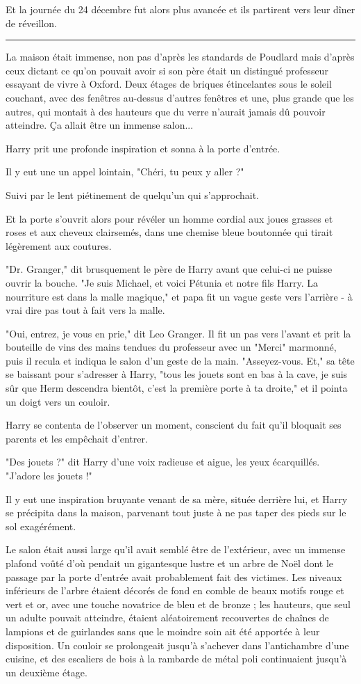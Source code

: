 Et la journée du 24 décembre fut alors plus avancée et ils partirent vers leur dîner de réveillon.
\par\noindent\rule{\textwidth}{0.4pt}
La maison était immense, non pas d'après les standards de Poudlard mais d'après ceux dictant ce qu'on pouvait avoir si son père était un distingué professeur essayant de vivre à Oxford. Deux étages de briques étincelantes sous le soleil couchant, avec des fenêtres au-dessus d'autres fenêtres et une, plus grande que les autres, qui montait à des hauteurs que du verre n'aurait jamais dû pouvoir atteindre. Ça allait être un immense salon...

Harry prit une profonde inspiration et sonna à la porte d'entrée.

Il y eut une un appel lointain, "Chéri, tu peux y aller ?"

Suivi par le lent piétinement de quelqu'un qui s'approchait.

Et la porte s'ouvrit alors pour révéler un homme cordial aux joues grasses et roses et aux cheveux clairsemés, dans une chemise bleue boutonnée qui tirait légèrement aux coutures.

"Dr. Granger," dit brusquement le père de Harry avant que celui-ci ne puisse ouvrir la bouche. "Je suis Michael, et voici Pétunia et notre fils Harry. La nourriture est dans la malle magique," et papa fit un vague geste vers l'arrière - à vrai dire pas tout à fait vers la malle.

"Oui, entrez, je vous en prie," dit Leo Granger. Il fit un pas vers l'avant et prit la bouteille de vins des mains tendues du professeur avec un "Merci" marmonné, puis il recula et indiqua le salon d'un geste de la main. "Asseyez-vous. Et," sa tête se baissant pour s'adresser à Harry, "tous les jouets sont en bas à la cave, je suis sûr que Herm descendra bientôt, c'est la première porte à ta droite," et il pointa un doigt vers un couloir.

Harry se contenta de l'observer un moment, conscient du fait qu'il bloquait ses parents et les empêchait d'entrer.

"Des jouets ?" dit Harry d'une voix radieuse et aigue, les yeux écarquillés. "J'adore les jouets !"

Il y eut une inspiration bruyante venant de sa mère, située derrière lui, et Harry se précipita dans la maison, parvenant tout juste à ne pas taper des pieds sur le sol exagérément.

Le salon était aussi large qu'il avait semblé être de l'extérieur, avec un immense plafond voûté d'où pendait un gigantesque lustre et un arbre de Noël dont le passage par la porte d'entrée avait probablement fait des victimes. Les niveaux inférieurs de l'arbre étaient décorés de fond en comble de beaux motifs rouge et vert et or, avec une touche novatrice de bleu et de bronze ; les hauteurs, que seul un adulte pouvait atteindre, étaient aléatoirement recouvertes de chaînes de lampions et de guirlandes sans que le moindre soin ait été apportée à leur disposition. Un couloir se prolongeait jusqu'à s'achever dans l'antichambre d'une cuisine, et des escaliers de bois à la rambarde de métal poli continuaient jusqu'à un deuxième étage.

